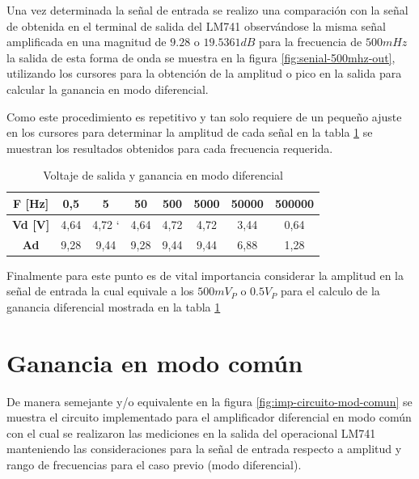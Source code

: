 Una vez determinada la señal de entrada se realizo una comparación con la señal de obtenida en el terminal de salida del LM741 observándose la misma señal amplificada en una magnitud de $9.28$ o $19.5361dB$ para la frecuencia de $500mHz$ la salida de esta forma de onda se muestra en la figura \ref{fig:senial-500mhz-out}, utilizando los cursores para la obtención de la amplitud o pico en la salida para calcular la ganancia en modo diferencial.


Como este procedimiento es repetitivo y tan solo requiere de un pequeño ajuste en los cursores para determinar la amplitud de cada señal en la tabla \ref{tab:ganancia-diferencial} se muestran los resultados obtenidos para cada frecuencia requerida.

\begin{table}[h]
	\centering
	\begin{tabular}{|c|c|c|c|c|c|c|c|}
		\hline
		\textbf{F {[}Hz{]}} & \textbf{0,5} & \textbf{5} & \textbf{50} & \textbf{500} & \textbf{5000} & \textbf{50000} & \textbf{500000} \\ \hline
		\textbf{Vd {[}V{]}} & 4,64         & 4,72 `      & 4,64        & 4,72         & 4,72          & 3,44           & 0,64            \\ \hline
		\textbf{Ad}         & 9,28         & 9,44       & 9,28        & 9,44         & 9,44          & 6,88           & 1,28            \\ \hline
	\end{tabular}
	\caption{Voltaje de salida y ganancia en modo diferencial}
	\label{tab:ganancia-diferencial}
\end{table}

Finalmente para este punto es de vital importancia considerar la amplitud en la señal de entrada la cual equivale a los $500mV_P$ o $0.5V_P$ para el calculo de la ganancia diferencial mostrada en la tabla \ref{tab:ganancia-diferencial} 

\section{Ganancia en modo común}

De manera semejante y/o equivalente en la figura \ref{fig:imp-circuito-mod-comun} se muestra el circuito implementado para el amplificador diferencial en modo común con el cual se realizaron las mediciones en la salida del operacional LM741 manteniendo las consideraciones para la señal de entrada respecto a amplitud y rango de frecuencias para el caso previo (modo diferencial).

